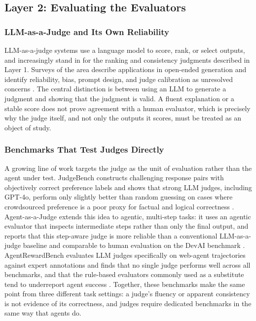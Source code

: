 \documentclass[conference]{IEEEtran}
\begin{document}
\subsection{Layer 2: Evaluating the Evaluators}
\subsubsection{LLM-as-a-Judge and Its Own Reliability}
LLM-as-a-judge systems use a language model to score, rank, or select outputs, and increasingly stand in for the ranking and consistency judgments described in Layer 1. Surveys of the area describe applications in open-ended generation and identify reliability, bias, prompt design, and judge calibration as unresolved concerns \cite{li2024evaluation,gu2025survey}. The central distinction is between using an LLM to generate a judgment and showing that the judgment is valid. A fluent explanation or a stable score does not prove agreement with a human evaluator, which is precisely why the judge itself, and not only the outputs it scores, must be treated as an object of study.

\subsubsection{Benchmarks That Test Judges Directly}
A growing line of work targets the judge as the unit of evaluation rather than the agent under test. JudgeBench constructs challenging response pairs with objectively correct preference labels and shows that strong LLM judges, including GPT-4o, perform only slightly better than random guessing on cases where crowdsourced preference is a poor proxy for factual and logical correctness \cite{tan2025judgebench}. Agent-as-a-Judge extends this idea to agentic, multi-step tasks: it uses an agentic evaluator that inspects intermediate steps rather than only the final output, and reports that this step-aware judge is more reliable than a conventional LLM-as-a-judge baseline and comparable to human evaluation on the DevAI benchmark \cite{zhuge2024agentasjudge}. AgentRewardBench evaluates LLM judges specifically on web-agent trajectories against expert annotations and finds that no single judge performs well across all benchmarks, and that the rule-based evaluators commonly used as a substitute tend to underreport agent success \cite{lu2025agentrewardbench}. Together, these benchmarks make the same point from three different task settings: a judge's fluency or apparent consistency is not evidence of its correctness, and judges require dedicated benchmarks in the same way that agents do.
\end{document}
